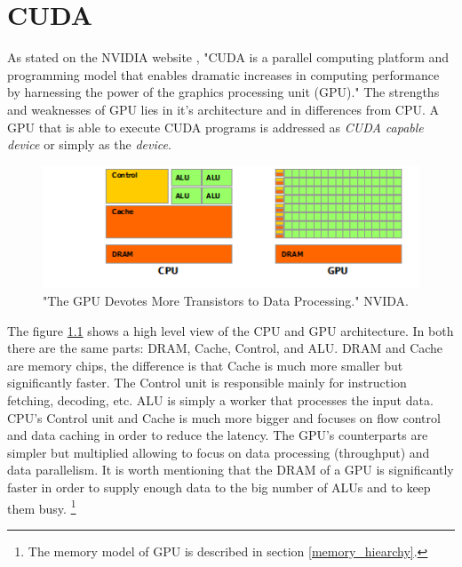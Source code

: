 \documentclass[12pt,oneside]{fithesis2}
\begin{document}
\chapter{CUDA}
As stated on the NVIDIA website \cite{about_cuda}, "CUDA is a parallel computing platform and programming model that enables dramatic increases in computing performance by harnessing the power of the graphics processing unit (GPU)." The strengths and weaknesses of GPU lies in it's architecture and in differences from CPU. A GPU that is able to execute CUDA programs is addressed as \emph{CUDA capable device} or simply as the \emph{device}.

\begin{figure}[H]
	\centering
	\includegraphics{figures/gpu-devotes-more-transistors-to-data-processing.png}
	\caption{"The GPU Devotes More Transistors to Data Processing." NVIDA. \cite{cuda_guide}}
	\label{fig:cpu_vs_gpu_arch}
\end{figure}

\noindent
The figure \ref{fig:cpu_vs_gpu_arch} shows a high level view of the CPU and GPU architecture. In both there are the same parts: DRAM, Cache, Control, and ALU. DRAM and Cache are memory chips, the difference is that Cache is much more smaller but significantly faster. The Control unit is responsible mainly for instruction fetching, decoding, etc. ALU is simply a worker that processes the input data. CPU's Control unit and Cache is much more bigger and focuses on flow control and data caching in order to reduce the latency. The GPU's counterparts are simpler but multiplied allowing to focus on data processing (throughput) and data parallelism. It is worth mentioning that the DRAM of a GPU is significantly faster in order to supply enough data to the big number of ALUs and to keep them busy. \footnote{The memory model of GPU is described in section \ref{memory_hiearchy}.}
\end{document}
